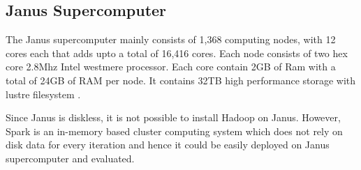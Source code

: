 \documentclass{article}
\begin{document}

\subsection*{Janus Supercomputer}
The Janus supercomputer mainly consists of 1,368 computing nodes, with  12 cores
each that adds upto a total of 16,416 cores. Each node consists of two hex core
2.8Mhz Intel westmere processor. Each core contain 2GB of Ram with a total of
24GB of RAM per node. It contains 32TB high performance storage with lustre
filesystem \citep{tufo}. 

Since Janus is diskless, it is not possible to install Hadoop on Janus.
However, Spark is an in-memory based cluster computing system which does not
rely on disk data for every iteration and hence it could be easily deployed on
Janus supercomputer and evaluated.



\end{document}
